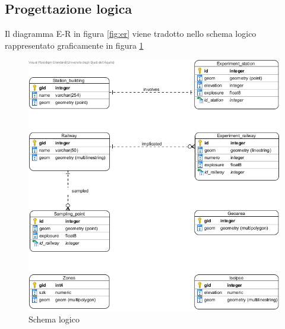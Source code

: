 \subsection{Progettazione logica}
Il diagramma E-R in figura \ref{fig:er} viene tradotto nello schema logico rappresentato graficamente in figura \ref{fig:schemaLogico}

\begin{figure}[h]
	\centering
	\includegraphics[width=1\textwidth]{img/schemaLogico}
	\caption{Schema logico}
    \label{fig:schemaLogico}
\end{figure}
